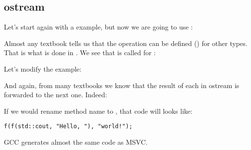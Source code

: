 \subsection{ostream}

Let's start again with a  example, but now we are going to use :



Almost any \Cpp textbook tells us that the \TT{<<} operation can be defined ()
for other types.
That is what is done in .
We see that  is called for :



Let's modify the example:



And again, from many \Cpp textbooks we know that the result of each  in ostream is forwarded to the
next one.
Indeed:



If we would rename  method name to \ttf{}, that code will looks like:

\begin{lstlisting}
f(f(std::cout, "Hello, "), "world!");
\end{lstlisting}

GCC generates almost the same code as MSVC.


